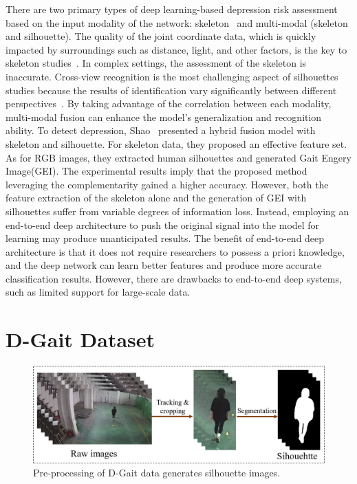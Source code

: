 \documentclass[10pt,twocolumn,letterpaper]{article}
\begin{document}
There are two primary types of deep learning-based depression risk assessment based on the input modality of the network: skeleton~\cite{yang2022data} and multi-modal (skeleton and silhouette).
The quality of the joint coordinate data, which is quickly impacted by surroundings such as distance, light, and other factors, is the key to skeleton studies~\cite{cippitelli2016human}.
In complex settings, the assessment of the skeleton is inaccurate.
Cross-view recognition is the most challenging aspect of silhouettes studies because the results of identification vary significantly between different perspectives~\cite{wu2016comprehensive}.
By taking advantage of the correlation between each modality, multi-modal fusion can enhance the model's generalization and recognition ability.
To detect depression, Shao~\cite{shao2021multi} presented a hybrid fusion model with skeleton and silhouette.
For skeleton data, they proposed an effective feature set. As for RGB images, they extracted human silhouettes
and generated Gait Engery Image(GEI).
The experimental results imply that the proposed method leveraging the complementarity gained a higher accuracy.
However, both the feature extraction of the skeleton alone and the generation of GEI with  silhouettes suffer from variable degrees of information loss.
Instead, employing an end-to-end deep architecture to push the original signal into the model for learning may produce unanticipated results.
The benefit of end-to-end deep architecture is that it does not require researchers to possess a priori knowledge, and the deep network can learn better features and produce more accurate classification results.
However, there are drawbacks to end-to-end deep systems, such as limited support for large-scale data.

\section{D-Gait Dataset}
\begin{figure}[t]
  \centering
   \includegraphics[width=1.0\linewidth]{figures/pre-processing02.jpg}

   \caption{ Pre-processing of D-Gait data generates silhouette images.
   }
   \label{pre-processing}
\end{figure}
\end{document}

